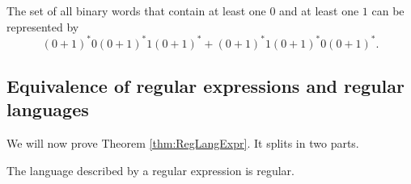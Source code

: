 \begin{page}
\setcounter{section}{2}
\setcounter{subsection}{1}
\setcounter{dfn}{6}
\label{portion:1089}

\begin{exl}
The set of all binary words that contain at least one $0$ and at least one $1$
can be represented by
\[
(0+1)^*0(0+1)^*1(0+1)^* + (0+1)^*1(0+1)^*0(0+1)^*.
\]
\end{exl}

\end{page}

\begin{page}
\setcounter{section}{2}
\setcounter{subsection}{2}
\setcounter{dfn}{6}
\label{portion:1092}

\subsection{Equivalence of regular expressions and regular languages}
We will now prove Theorem \ref{thm:RegLangExpr}.
It splits in two parts.


\end{page}

\begin{page}
\setcounter{section}{2}
\setcounter{subsection}{2}
\setcounter{dfn}{7}
\label{portion:1094}

\begin{lem}
The language described by a regular expression is regular.
\end{lem}

\end{page}

